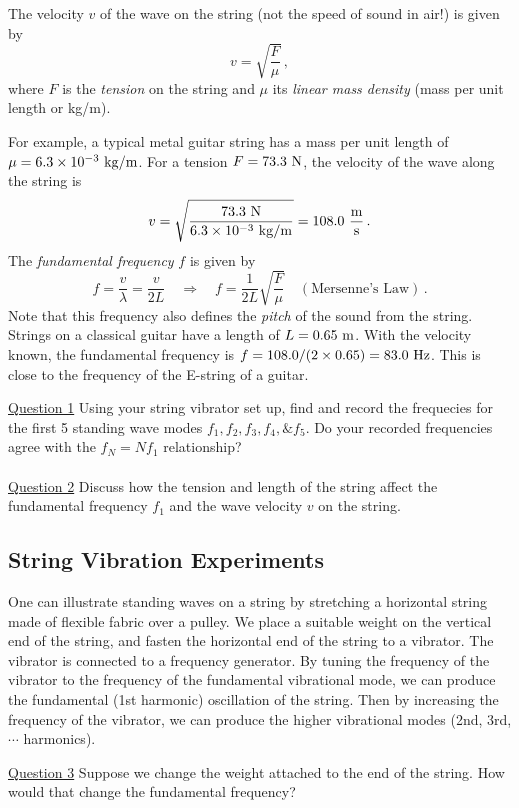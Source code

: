 \documentclass[11pt]{NSF}
\def\be{\begin{equation}}
\def\ee{\end{equation}}
\begin{document}
The velocity $v$ of the wave on the string 
(not the speed of sound in air!) is given by
%
\be
v = \sqrt{\frac{F}{\mu}}\,,
\ee
%
where $F$ is the {\em tension} on the string and $\mu$ its 
{\em linear mass density} (mass per unit length or kg/m).

For example, a typical metal guitar string has a mass per 
unit length of $\mu = 6.3\times 10^{-3}~{\rm kg/m}$. 
For a tension $F =73.3~{\rm N}$, the velocity of the wave 
along the string is
%
\be
v=\sqrt{\frac{73.3~{\rm N}}{6.3\times 10^{-3}~{\rm kg/m}}}
=108.0~\frac{{\rm m}}{{\rm s}}\,.
\ee
%
The {\em fundamental frequency} $f$ is given by
%
\be
f=\frac{v}{\lambda} = \frac{v}{2L}
\quad\Rightarrow\quad
f=\frac{1}{2L}\sqrt{\frac{F}{\mu}}
\quad(\text{Mersenne's Law})\,.
\ee
%
Note that this frequency also defines the {\em pitch} of 
the sound from the string. Strings on a classical
guitar have a length of $L= 0.65~{\rm m}$. 
With the velocity known, the fundamental frequency is
$f= 108.0/(2\times 0.65)=83.0~{\rm Hz}$.
This is close to the frequency of the E-string of a guitar.

\underline{Question 1} Using your string vibrator set up, find and record the frequecies for the first 5 standing wave modes $f_1, f_2, f_3,  f_4, \& f_5$. Do your recorded frequencies agree with the $f_N = Nf_1$ relationship? \\ \\

\underline{Question 2} Discuss how the tension and length of the string affect the fundamental frequency $f_1$ and 
the wave velocity $v$ on the string.


\subsection{String Vibration Experiments}

One can illustrate standing waves on a string by stretching 
a horizontal string made of flexible fabric over a pulley. 
We place a suitable weight on the vertical end of the string,
and fasten the horizontal end of the string to a vibrator. 
The vibrator is connected to a frequency generator. 
By tuning the frequency of the vibrator to the 
frequency of the fundamental vibrational mode,
we can produce the fundamental (1st harmonic) 
oscillation of the string. 
Then by increasing the frequency of the vibrator,
we can produce the higher
vibrational modes (2nd, 3rd, $\cdots$ harmonics).


\underline{Question 3} Suppose we change the weight attached to the end of 
the string.
How would that change the fundamental frequency?
\end{document}
